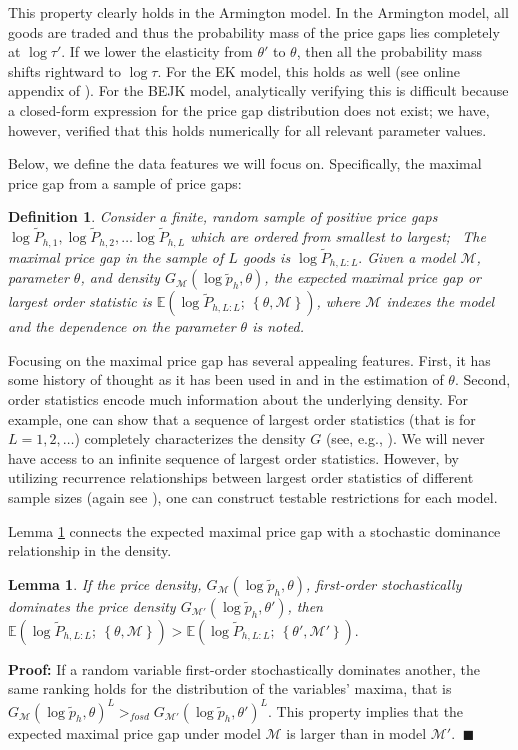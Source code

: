 \documentclass[12pt,dvips, ps2pdf]{article}
\newtheorem{df}{Definition}
\newtheorem{lemma}{Lemma}
\begin{document}
This property clearly holds in the Armington model. In the Armington model, all goods are traded and thus the probability mass of the price gaps lies completely at $\log \tau'$. If we lower the elasticity from $\theta'$ to $\theta$, then all the probability mass shifts rightward to $\log \tau$. For the EK model, this holds as well (see online appendix of \citet{sw_jie}). For the BEJK model, analytically verifying this is difficult because a closed-form expression for the price gap distribution does not exist; we have, however, verified that this holds numerically for all relevant parameter values.

Below, we define the data features we will focus on. Specifically, the maximal price gap from a sample of price gaps:
\vspace{-.25cm}
\begin{df}
Consider a finite, random sample of positive price gaps $\log \tilde P_{h,1}, \log \tilde P_{h,2}, \ldots \log \tilde P_{h,L}$ which are ordered from smallest to largest; \ The maximal price gap in the sample of $L$ goods is $\log \tilde P_{h,L:L}.$ Given a model $\mathcal{M}$, parameter $\theta$, and density $G_{\mathcal{M}}(\log \tilde p_{h}, \theta)$, the expected maximal price gap or largest order statistic is $\mathbb{E}\left(\log \tilde P_{h,L:L}; \ \left\{\theta,{\mathcal{M}}\right\} \right)$, where $\mathcal{M}$ indexes the model and the dependence on the parameter $\theta$ is noted.
\end{df}
Focusing on the maximal price gap has several appealing features. First, it has some history of thought as it has been used in \citet{ek02} and \citet{sw_jie} in the estimation of $\theta$. Second, order statistics encode much information about the underlying density. For example, one can show that a sequence of largest order statistics (that is for $L = 1,2,\ldots$) completely characterizes the density $G$ (see, e.g., \citet{arnold1992first}).  We will never have access to an infinite sequence of largest order statistics. However, by utilizing recurrence relationships between largest order statistics of different sample sizes (again see \citet{arnold1992first}), one can construct testable restrictions for each model.

Lemma \ref{lemma1} connects the expected maximal price gap with a stochastic dominance relationship in the density.
\begin{lemma}
\label{lemma1}If the price density, $G_{\mathcal{M}}(\log \tilde p_{h}, \theta)$, first-order stochastically dominates the price density $G_{\mathcal{M'}}(\log \tilde p_{h}, \theta')$, then $\mathbb{E}\left(\log \tilde P_{h,L:L}; \ \left\{\theta,{\mathcal{M}}\right\} \right) > \mathbb{E}\left(\log \tilde P_{h,L:L}; \ \left\{\theta',{\mathcal{M'}}\right\}\right).$
\end{lemma}
\vspace{-.15cm}
\textbf{Proof:} If a random variable first-order stochastically dominates another, the same ranking holds for the distribution of the variables' maxima, that is $G_{\mathcal{M}}(\log \tilde p_{h}, \theta)^L >_{fosd} G_{\mathcal{M'}}(\log \tilde p_{h}, \theta')^L$. This property implies that the expected maximal price gap under model $\mathcal{M}$ is larger than in model $\mathcal{M'}$. $\ \blacksquare$
\end{document}
